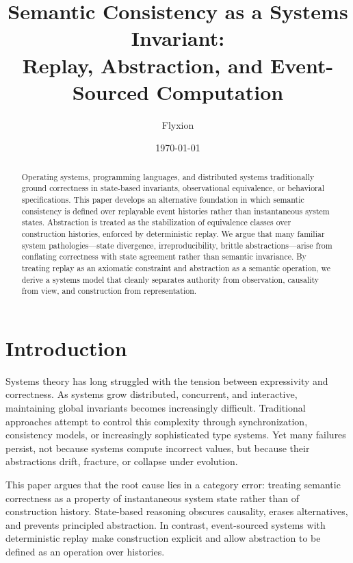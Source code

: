 \documentclass[11pt]{article}
\title{Semantic Consistency as a Systems Invariant:\\
Replay, Abstraction, and Event-Sourced Computation}
\author{Flyxion}
\date{\today}
\begin{document}
\maketitle

\begin{abstract}
Operating systems, programming languages, and distributed systems traditionally ground correctness in state-based invariants, observational equivalence, or behavioral specifications. This paper develops an alternative foundation in which semantic consistency is defined over replayable event histories rather than instantaneous system states. Abstraction is treated as the stabilization of equivalence classes over construction histories, enforced by deterministic replay. We argue that many familiar system pathologies—state divergence, irreproducibility, brittle abstractions—arise from conflating correctness with state agreement rather than semantic invariance. By treating replay as an axiomatic constraint and abstraction as a semantic operation, we derive a systems model that cleanly separates authority from observation, causality from view, and construction from representation.
\end{abstract}

\section{Introduction}

Systems theory has long struggled with the tension between expressivity and correctness. As systems grow distributed, concurrent, and interactive, maintaining global invariants becomes increasingly difficult. Traditional approaches attempt to control this complexity through synchronization, consistency models, or increasingly sophisticated type systems. Yet many failures persist, not because systems compute incorrect values, but because their abstractions drift, fracture, or collapse under evolution.

This paper argues that the root cause lies in a category error: treating semantic correctness as a property of instantaneous system state rather than of construction history. State-based reasoning obscures causality, erases alternatives, and prevents principled abstraction. In contrast, event-sourced systems with deterministic replay make construction explicit and allow abstraction to be defined as an operation over histories.
\end{document}
